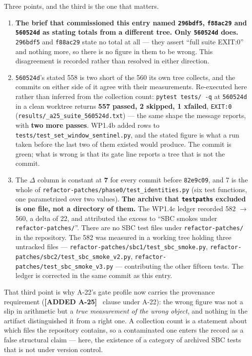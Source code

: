 \documentclass[
  10pt,
]{article}
\providecommand{\tightlist}{%
  \setlength{\itemsep}{0pt}\setlength{\parskip}{0pt}}
\newcommand{\amdnew}[1]{{\color{amdcolor}\footnotesize\textbf{[ADDED #1]}}\ }
\begin{document}
\noindent Three points, and the third is the one that matters.

\begin{enumerate}
\tightlist
\item \textbf{The brief that commissioned this entry named \texttt{296bdf5}, \texttt{f88ac29} and \texttt{560524d} as stating totals from a different tree. Only \texttt{560524d} does.} \texttt{296bdf5} and \texttt{f88ac29} state no total at all --- they assert ``full suite EXIT:0'' and nothing more, so there is no figure in them to be wrong. This disagreement is recorded rather than resolved in either direction.
\item \texttt{560524d}'s stated 558 is two short of the 560 its own tree collects, and the commits on either side of it agree with their measurements. Re-executed here rather than inferred from the collection count: \texttt{pytest tests/ -q} at \texttt{560524d} in a clean worktree returns \textbf{557 passed, 2 skipped, 1 xfailed}, \texttt{EXIT:0} (\texttt{results/\allowbreak{}\_a25\_suite\_560524d.txt}) --- the same shape the message reports, with \textbf{two more passes}. WP1.4b added rows to \texttt{tests/\allowbreak{}test\_set\_window\_sentinel.py}, and the stated figure is what a run taken before the last two of them existed would produce. The commit is green; what is wrong is that its gate line reports a tree that is not the commit.
\item The \(\Delta\) column is constant at \textbf{7} for every commit before \texttt{82e9c09}, and 7 is the whole of \texttt{refactor-patches/\allowbreak{}phase0/\allowbreak{}test\_identities.py} (six test functions, one parametrized over two values). \textbf{The archive that \texttt{testpaths} excluded is one file, not a directory of them.} The WP1.4c ledger recorded 582 \(\to\) 560, a delta of 22, and attributed the excess to ``SBC smokes under \texttt{refactor-patches/}''. There are no SBC test files under \texttt{refactor-patches/} in the repository. The 582 was measured in a working tree holding three untracked files --- \texttt{refactor-patches/\allowbreak{}sbc1/\allowbreak{}test\_sbc\_smoke.py}, \texttt{refactor-patches/\allowbreak{}sbc2/\allowbreak{}test\_sbc\_smoke\_v2.py}, \texttt{refactor-patches/\allowbreak{}test\_sbc\_smoke\_v3.py} --- contributing the other fifteen tests. The ledger is corrected in the same commit as this entry.
\end{enumerate}

\noindent That third point is why A-22's gate profile now carries the provenance requirement (\amdnew{A-25} clause under A-22): the wrong figure was not a slip in arithmetic but a \emph{true measurement of the wrong object}, and nothing in the artifact distinguished it from a right one. A collection count is a statement about which files the repository contains, so a contaminated one enters the record as a false structural claim --- here, the existence of a category of archived SBC tests that is not under version control.
\end{document}
